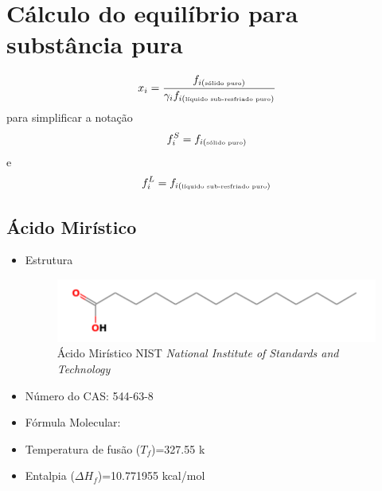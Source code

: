 	\section{Cálculo do equilíbrio para substância pura}
	
	\hspace{5mm} 
	
	\lipsum[13-15]
	\begin{equation}\label{eq:atividade_1}x_i=\frac{f_{i(\mbox{\tiny sólido puro})}}{\gamma_{i}f_{i(\mbox{\tiny líquido sub-resfriado puro})}}
	\end{equation}
	para simplificar a notação
	\begin{equation*}
	f_{i}^{S}=f_{i(\mbox{\tiny sólido puro})}
	\end{equation*}
	e
	\begin{equation*}
	f_{i}^{L}=f_{i(\mbox{\tiny líquido sub-resfriado puro})}
	\end{equation*}
	
	\lipsum[13-15]

	\subsection{Ácido Mirístico}
	\label{sec:1}
	\begin{itemize}
		\item Estrutura
		\begin{figure}[H]
			\centering
			\includegraphics[width=0.7\linewidth]{dados/figuras/Ac_miristico.png}
			\caption[Ácido Mirístico]{Ácido Mirístico  NIST \textit{National Institute of Standards and Technology}}
			\label{fig:nist1}
		\end{figure}
		\item Número do CAS: 544-63-8
		\item Fórmula Molecular: 
		\item Temperatura de fusão ($T_f$)=327.55 k
		\item Entalpia ($\Delta H_{f}$)=10.771955 kcal/mol
	\end{itemize}
	
